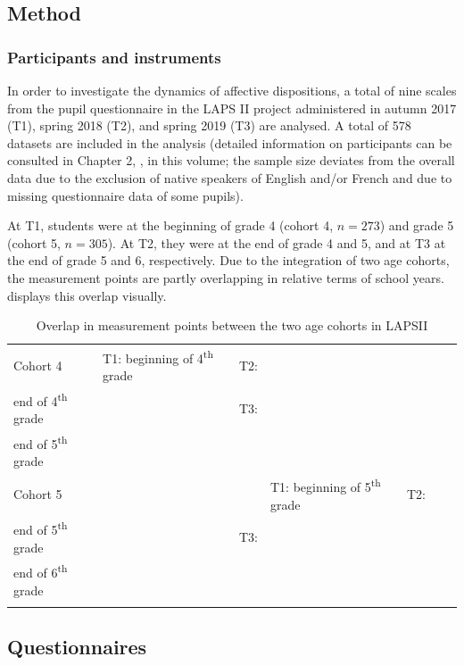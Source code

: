 \documentclass[output=paper]{langsci/langscibook}
\begin{document}
\subsection{Method}
\subsubsection{Participants and instruments}

In order to investigate the dynamics of affective dispositions, a total of nine scales from the pupil questionnaire in the LAPS II project administered in autumn 2017 (T1), spring 2018 (T2), and spring 2019 (T3) are analysed. A total of 578 datasets are included in the analysis (detailed information on participants can be consulted in Chapter 2, , in this volume; the sample size deviates from the overall data due to the exclusion of native speakers of English and/or French and due to missing questionnaire data of some pupils). 

At T1, students were at the beginning of grade 4 (cohort 4, $n=273$) and grade 5 (cohort 5, $n=305$). At T2, they were at the end of grade 4 and 5, and at T3 at the end of grade 5 and 6, respectively. Due to the integration of two age cohorts, the measurement points are partly overlapping in relative terms of school years.  displays this overlap visually.

\begin{table}
\begin{tabular}{lllllll}
\lsptoprule
Cohort 4 & T1: beginning of 4\textsuperscript{th} grade & T2: \\
end of 4\textsuperscript{th} grade &  & T3: \\
end of 5\textsuperscript{th} grade &  & \\
Cohort 5 &  &  & T1: beginning of 5\textsuperscript{th} grade & T2: \\
end of 5\textsuperscript{th} grade &  & T3: \\
end of 6\textsuperscript{th} grade\\
\lspbottomrule
\end{tabular}
\caption{\label{bkm:Ref32572945}\label{tab:08:1}Overlap in measurement points between the two age cohorts in LAPSII}
\end{table}

\subsection{Questionnaires}
\end{document}
